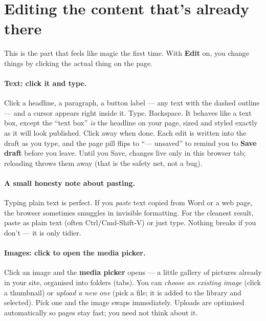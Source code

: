 \documentclass[11pt]{article}
\begin{document}
\section{Editing the content that's already there}\label{sec:inline}

This is the part that feels like magic the first time. With \textbf{Edit} on, you
change things by clicking the actual thing on the page.

\paragraph{Text: click it and type.} Click a headline, a paragraph, a button label
--- any text with the dashed outline --- and a cursor appears right inside it. Type.
Backspace. It behaves like a text box, except the ``text box'' \emph{is} the headline
on your page, sized and styled exactly as it will look published. Click away when
done. Each edit is written into the draft as you type, and the page pill flips to
``--- unsaved'' to remind you to \textbf{Save draft} before you leave. Until you Save,
changes live only in this browser tab; reloading throws them away (that is the safety
net, not a bug).

\paragraph{A small honesty note about pasting.} Typing plain text is perfect. If you
\emph{paste} text copied from Word or a web page, the browser sometimes smuggles in
invisible formatting. For the cleanest result, paste as plain text (often
Ctrl/Cmd-Shift-V) or just type. Nothing breaks if you don't --- it is only tidier.

\paragraph{Images: click to open the media picker.} Click an image and the
\textbf{media picker} opens --- a little gallery of pictures already in your site,
organised into folders (tabs). You can \emph{choose an existing image} (click a
thumbnail) or \emph{upload a new one} (pick a file; it is added to the library and
selected). Pick one and the image swaps immediately. Uploads are optimised
automatically so pages stay fast; you need not think about it.
\end{document}
